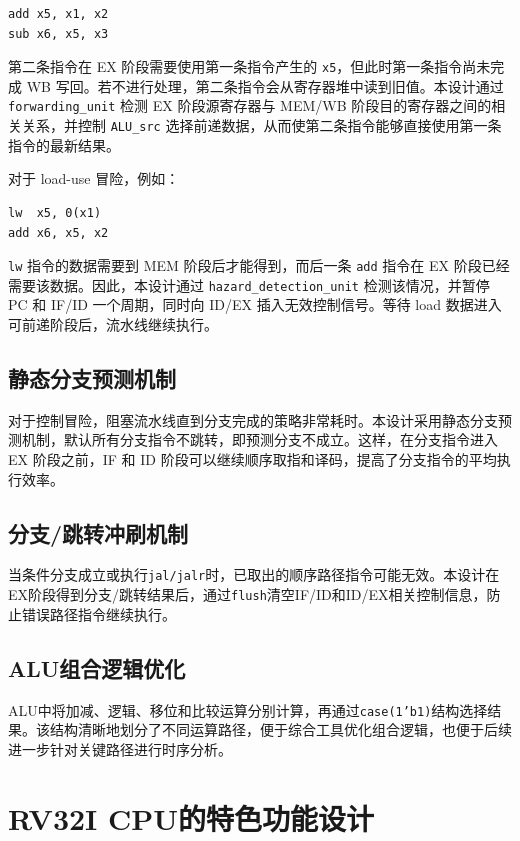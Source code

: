 \documentclass[12pt,a4paper]{ctexart}
\newcommand{\code}[1]{\texttt{#1}}
\begin{document}
\begin{verbatim}
add x5, x1, x2
sub x6, x5, x3
\end{verbatim}

第二条指令在 EX 阶段需要使用第一条指令产生的 \code{x5}，但此时第一条指令尚未完成 WB 写回。若不进行处理，第二条指令会从寄存器堆中读到旧值。本设计通过 \code{forwarding\_unit} 检测 EX 阶段源寄存器与 MEM/WB 阶段目的寄存器之间的相关关系，并控制 \code{ALU\_src} 选择前递数据，从而使第二条指令能够直接使用第一条指令的最新结果。

对于 load-use 冒险，例如：

\begin{verbatim}
lw  x5, 0(x1)
add x6, x5, x2
\end{verbatim}

\code{lw} 指令的数据需要到 MEM 阶段后才能得到，而后一条 \code{add} 指令在 EX 阶段已经需要该数据。因此，本设计通过 \code{hazard\_detection\_unit} 检测该情况，并暂停 PC 和 IF/ID 一个周期，同时向 ID/EX 插入无效控制信号。等待 load 数据进入可前递阶段后，流水线继续执行。


\subsection{静态分支预测机制}

对于控制冒险，阻塞流水线直到分支完成的策略非常耗时。本设计采用静态分支预测机制，默认所有分支指令不跳转，即预测分支不成立。这样，在分支指令进入 EX 阶段之前，IF 和 ID 阶段可以继续顺序取指和译码，提高了分支指令的平均执行效率。

\subsection{分支/跳转冲刷机制}
当条件分支成立或执行\code{jal/jalr}时，已取出的顺序路径指令可能无效。本设计在EX阶段得到分支/跳转结果后，通过\code{flush}清空IF/ID和ID/EX相关控制信息，防止错误路径指令继续执行。

\subsection{ALU组合逻辑优化}

ALU中将加减、逻辑、移位和比较运算分别计算，再通过\code{case(1'b1)}结构选择结果。该结构清晰地划分了不同运算路径，便于综合工具优化组合逻辑，也便于后续进一步针对关键路径进行时序分析。


\section{RV32I CPU的特色功能设计}
\end{document}
